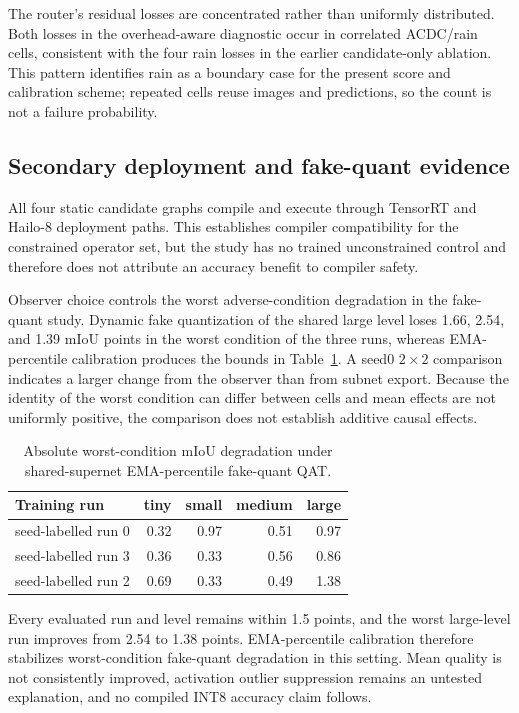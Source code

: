 \documentclass[a4paper,review,12pt]{elsarticle}
\newcommand{\miou}{mIoU}
\begin{document}
The router's residual losses are concentrated rather than uniformly distributed. Both losses in the overhead-aware diagnostic occur in correlated ACDC/rain cells, consistent with the four rain losses in the earlier candidate-only ablation. This pattern identifies rain as a boundary case for the present score and calibration scheme; repeated cells reuse images and predictions, so the count is not a failure probability.

\subsection{Secondary deployment and fake-quant evidence}
\label{sec:qatresults}

All four static candidate graphs compile and execute through TensorRT and Hailo-8 deployment paths. This establishes compiler compatibility for the constrained operator set, but the study has no trained unconstrained control and therefore does not attribute an accuracy benefit to compiler safety.

Observer choice controls the worst adverse-condition degradation in the fake-quant study. Dynamic fake quantization of the shared large level loses 1.66, 2.54, and 1.39 \miou{} points in the worst condition of the three runs, whereas EMA-percentile calibration produces the bounds in Table~\ref{tab:qat}. A seed0 $2\times2$ comparison indicates a larger change from the observer than from subnet export. Because the identity of the worst condition can differ between cells and mean effects are not uniformly positive, the comparison does not establish additive causal effects.

\begin{table}[t]
\centering
\caption{Absolute worst-condition \miou{} degradation under shared-supernet EMA-percentile fake-quant QAT.}
\label{tab:qat}
\begin{tabular}{@{}lrrrr@{}}
\toprule
Training run & tiny & small & medium & large \\
\midrule
seed-labelled run 0 & 0.32 & 0.97 & 0.51 & 0.97 \\
seed-labelled run 3 & 0.36 & 0.33 & 0.56 & 0.86 \\
seed-labelled run 2 & 0.69 & 0.33 & 0.49 & 1.38 \\
\bottomrule
\end{tabular}
\end{table}

Every evaluated run and level remains within 1.5 points, and the worst large-level run improves from 2.54 to 1.38 points. EMA-percentile calibration therefore stabilizes worst-condition fake-quant degradation in this setting. Mean quality is not consistently improved, activation outlier suppression remains an untested explanation, and no compiled INT8 accuracy claim follows.
\end{document}
